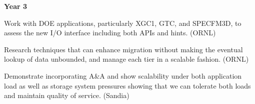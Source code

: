 \textbf{Year 3}
\begin{tightItemize}
\item Work with DOE applications, particularly XGC1, GTC, and SPECFM3D, to assess 
the new I/O interface including both APIs and hints. (ORNL)
\item Research techniques that can enhance migration without making the eventual 
lookup of data unbounded, and manage each tier in a scalable fashion. (ORNL)
\item Demonstrate incorporating A\&A and show scalability under both application load as
well as storage system pressures showing that we can tolerate both loads and maintain quality of
service. (Sandia)
\end{tightItemize}
